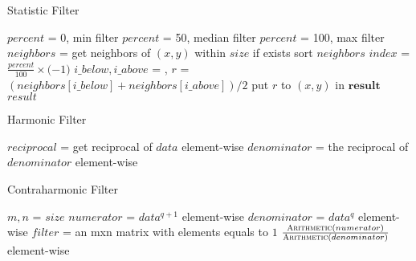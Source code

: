 \documentclass{article}
\begin{document}
  \begin{algorithm}
    \caption{Statistic Filter}
    \label{Statistic}
    \begin{algorithmic}[1]
    \LineComment $percent$ = 0, min filter
    \LineComment $percent$ = 50, median filter
    \LineComment $percent$ = 100, max filter
    \State $neighbors$ = get neighbors of $(x,y)$ within $size$ if exists
    \State sort $neighbors$
    \State $index$ = $\frac{percent}{100}\times($$-1)$
    \State $i\_below, i\_above$ = , 
    \State $r$ = $(neighbors[i\_below] + neighbors[i\_above]) / 2$
    \State put $r$ to $(x,y)$ in $\mathbf{result}$
    \EndFor
    \State \Return $result$
    \EndFunction
    \end{algorithmic}
  \end{algorithm}

  \newpage

  \begin{algorithm}
    \caption{Harmonic Filter}
    \label{Harmonic}
    \begin{algorithmic}[1]
    \State $reciprocal$ = get reciprocal of $data$ element-wise
    \State $denominator$ = 
    \State \Return the reciprocal of $denominator$ element-wise
    \EndFunction
    \end{algorithmic}
  \end{algorithm}

  \begin{algorithm}
    \caption{Contraharmonic Filter}
    \label{Contraharmonic}
    \begin{algorithmic}[1]
    \State $m,n$ = $size$
    \State $numerator$ = $data^{q+1}$ element-wise
    \State $denominator$ = $data^{q}$ element-wise
    \State $filter$ = an mxn matrix with elements equals to $1$
    \State \Return $\frac{\Call{Arithmetic}{numerator}}{\Call{Arithmetic}{denominator}}$ element-wise
    \EndFunction
    \end{algorithmic}
  \end{algorithm}

\end{document}
